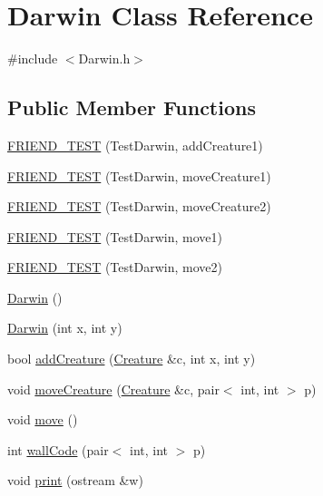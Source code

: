 \hypertarget{classDarwin}{\section{Darwin Class Reference}
\label{classDarwin}
}


{\ttfamily \#include $<$Darwin.\-h$>$}

\subsection*{Public Member Functions}
\begin{DoxyCompactItemize}
\item 
\hyperlink{classDarwin_a793a002e201d4c85665b7ba5f1780be1}{F\-R\-I\-E\-N\-D\-\_\-\-T\-E\-S\-T} (Test\-Darwin, add\-Creature1)
\item 
\hyperlink{classDarwin_a54adef3f8f6a53c7e2e97ed28347de41}{F\-R\-I\-E\-N\-D\-\_\-\-T\-E\-S\-T} (Test\-Darwin, move\-Creature1)
\item 
\hyperlink{classDarwin_a9c835a2b3d0bc7e31e8698399c1f474e}{F\-R\-I\-E\-N\-D\-\_\-\-T\-E\-S\-T} (Test\-Darwin, move\-Creature2)
\item 
\hyperlink{classDarwin_aaa2523447a6cb43fb75c65a378b571e5}{F\-R\-I\-E\-N\-D\-\_\-\-T\-E\-S\-T} (Test\-Darwin, move1)
\item 
\hyperlink{classDarwin_a1bd52af014fb318ccbb8df5d677f4b37}{F\-R\-I\-E\-N\-D\-\_\-\-T\-E\-S\-T} (Test\-Darwin, move2)
\item 
\hyperlink{classDarwin_a0bd882cc82538795f11b8ac3a8eb7965}{Darwin} ()
\item 
\hyperlink{classDarwin_ab19aeb32fa31eee1f42c38b18aa14673}{Darwin} (int x, int y)
\item 
bool \hyperlink{classDarwin_aca0432f5c01eab37ce97a1e92d76e60c}{add\-Creature} (\hyperlink{classCreature}{Creature} \&c, int x, int y)
\item 
void \hyperlink{classDarwin_a58f52e8dd92d2111df70600146d2b53c}{move\-Creature} (\hyperlink{classCreature}{Creature} \&c, pair$<$ int, int $>$ p)
\item 
void \hyperlink{classDarwin_aa6f0dc1e57b270d55be81e1e72a1ab5a}{move} ()
\item 
int \hyperlink{classDarwin_a71a65431c6e367e0fe72478f43190f1b}{wall\-Code} (pair$<$ int, int $>$ p)
\item 
void \hyperlink{classDarwin_a61e92c982448f89a657130b223cf2816}{print} (ostream \&w)
\end{DoxyCompactItemize}
